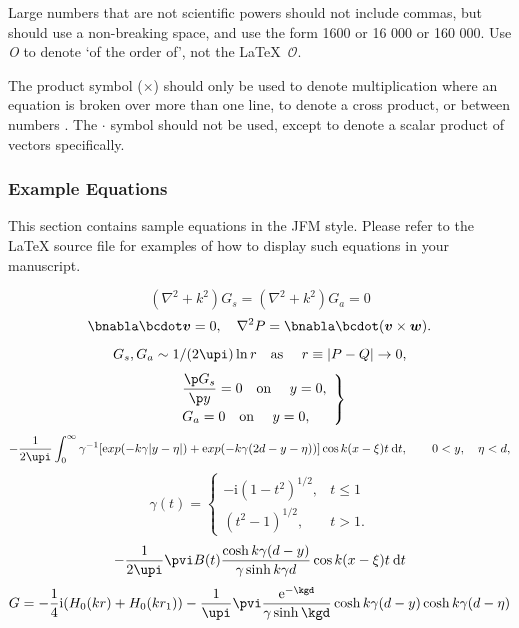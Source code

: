 \documentclass[lineno]{JFM-FLM_Au}
\begin{document}
Large numbers  that are not scientific powers should not include commas, but should use a non-breaking space, and use the form 1600 or 16 000 or 160 000.
Use \textit{O} to denote `of the order of', not the \LaTeX\ $\mathcal{O}$.

The product symbol ($\times$) should only be used to denote multiplication where an equation is broken over more than one line, to denote a cross product, or between numbers . The $\boldsymbol {\cdot}$ symbol should not be used, except to denote a scalar product of vectors specifically.

\subsubsection{Example Equations}

This section contains sample equations in the JFM style. Please refer to the {\LaTeX} source file for examples of how to display such equations in your manuscript.

\begin{equation}
  (\nabla^2+k^2)G_s=(\nabla^2+k^2)G_a=0
  \label{Helm}
\end{equation}
\begin{equation}
  \bnabla\bcdot\boldsymbol{v} = 0,\quad \nabla^{2}P=
    \bnabla\bcdot(\boldsymbol{v}\times \boldsymbol{w}).
\end{equation}
\begin{equation}
  G_s,G_a\sim 1 / (2\upi)\ln r
  \quad \mbox{as\ }\quad r\equiv|P-Q|\rightarrow 0,
  \label{singular}
\end{equation}
\begin{equation}
\left. \begin{array}{ll}
\displaystyle\frac{\p G_s}{\p y}=0
  \quad \mbox{on\ }\quad y=0,\\[8pt]
\displaystyle  G_a=0
  \quad \mbox{on\ }\quad y=0,
 \end{array}\right\}
  \label{symbc}
\end{equation}
\begin{equation}
  -\frac{1}{2\upi} \int_0^{\infty} \gamma^{-1}[\mathrm exp(-k\gamma|y-\eta|)
   + \mathrm exp(-k\gamma(2d-y-\eta))] \cos k(x-\xi)t\:\mathrm{d} t,
   \qquad 0<y,\quad \eta<d,
\end{equation}
\begin{equation}
  \gamma(t) = \left\{
    \begin{array}{ll}
      -\mathrm{i}(1-t^2)^{1/2}, & t\le 1 \\[2pt]
      (t^2-1)^{1/2},         & t>1.
    \end{array} \right.
\end{equation}
\[
  -\frac{1}{2\upi}
   \pvi B(t)\frac{\cosh k\gamma(d-y)}{\gamma\sinh k\gamma d}
   \cos k(x-\xi)t\:\mathrm{d} t
\]
\begin{equation}
  G = -\frac{1}{4}\mathrm{i} (H_0(kr)+H_0(kr_1))
    - \frac{1}{\upi} \pvi\frac{\mathrm{e}^{-\kgd}}%
    {\gamma\sinh\kgd} \cosh k\gamma(d-y) \cosh k\gamma(d-\eta)
\end{equation}
\end{document}
